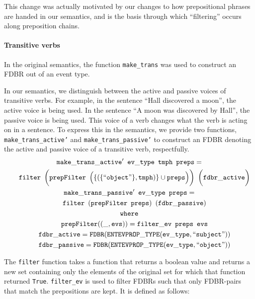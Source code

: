 \documentclass[../main.tex]{subfiles}
\begin{document}
This change was actually motivated by our changes to how prepositional phrases are handed in our semantics, and is the basis through which
``filtering'' occurs along preposition chains.

\paragraph{Transitive verbs}

In the original semantics, the function \texttt{make\_trans} was used to
construct an FDBR out of an event type.

In our semantics, we distinguish between the active and passive voices of transitive verbs.  For example, in the sentence ``Hall discovered a moon'', the active voice is being used.
In the sentence ``A moon was discovered by Hall'', the passive voice is being
used.  This voice of a verb changes what the verb is acting on in  a sentence.  To express this in the semantics,
we provide two functions, \texttt{make\_trans\_active'} and \texttt{make\_trans\_passive'} to construct an FDBR denoting the active and passive voice of a transitive verb, respectfully.\\
{\setlength{\mathindent}{0cm}
\begin{gather*}
\mathtt{make\_trans\_active'}\enspace \mathtt{ev\_type}\enspace \mathtt{tmph}\enspace \mathtt{preps} = \\
	\mathtt{\indent filter}\enspace \bigg(\mathtt{prepFilter}\enspace \Big(\{(\{\text{``\texttt{object}''}\}, \mathtt{tmph})\} \cup \mathtt{preps}\Big)\bigg)\enspace \bigg(\mathtt{fdbr\_active}\bigg) \\
\mathtt{make\_trans\_passive'}\enspace \mathtt{ev\_type}\enspace \mathtt{preps} = \\
	\mathtt{\indent filter}\enspace (\mathtt{prepFilter}\enspace \mathtt{preps})\enspace (\mathtt{fdbr\_passive}) \\
\mathtt{ where} \\
\mathtt{\indent prepFilter} ((\_, \mathtt{evs})) = \mathtt{filter\_ev}\enspace \mathtt{preps}\enspace \mathtt{evs} \\
\mathtt{\indent fdbr\_active} = \mathtt{FDBR}(\mathtt{ENTEVPROP\_TYPE}(\mathtt{ev\_type}, \text{``\texttt{subject}''})) \\
\mathtt{\indent fdbr\_passive} = \mathtt{FDBR}(\mathtt{ENTEVPROP\_TYPE}(\mathtt{ev\_type}, \text{``\texttt{object}''}))
\end{gather*}
}

The \texttt{filter} function takes a function that returns a boolean value and returns a new set containing only the elements of the original set for which that function returned \texttt{True}.
\texttt{filter\_ev} is used to filter FDBRs such that only FDBR-pairs that match
the prepositions are kept. It is defined as follows:\\
\end{document}

